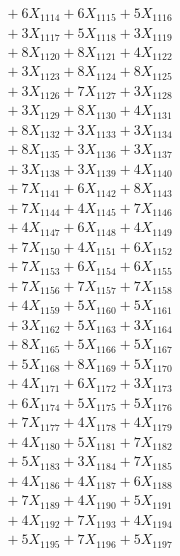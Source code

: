 \documentclass[a4paper,10pt]{article}
\begin{document}
{\begin{align}
&\;  + 6 X_{1114} + 6 X_{1115} + 5 X_{1116} \\[0.3ex]
&\;  + 3 X_{1117} + 5 X_{1118} + 3 X_{1119} \\[0.5ex]\allowbreak
&\;  + 8 X_{1120} + 8 X_{1121} + 4 X_{1122} \\[0.3ex]
&\;  + 3 X_{1123} + 8 X_{1124} + 8 X_{1125} \\[0.3ex]
&\;  + 3 X_{1126} + 7 X_{1127} + 3 X_{1128} \\[0.3ex]
&\;  + 3 X_{1129} + 8 X_{1130} + 4 X_{1131} \\[0.3ex]
&\;  + 8 X_{1132} + 3 X_{1133} + 3 X_{1134} \\[0.3ex]
&\;  + 8 X_{1135} + 3 X_{1136} + 3 X_{1137} \\[0.3ex]
&\;  + 3 X_{1138} + 3 X_{1139} + 4 X_{1140} \\[0.3ex]
&\;  + 7 X_{1141} + 6 X_{1142} + 8 X_{1143} \\[0.3ex]
&\;  + 7 X_{1144} + 4 X_{1145} + 7 X_{1146} \\[0.3ex]
&\;  + 4 X_{1147} + 6 X_{1148} + 4 X_{1149} \\[0.5ex]\allowbreak
&\;  + 7 X_{1150} + 4 X_{1151} + 6 X_{1152} \\[0.3ex]
&\;  + 7 X_{1153} + 6 X_{1154} + 6 X_{1155} \\[0.3ex]
&\;  + 7 X_{1156} + 7 X_{1157} + 7 X_{1158} \\[0.3ex]
&\;  + 4 X_{1159} + 5 X_{1160} + 5 X_{1161} \\[0.3ex]
&\;  + 3 X_{1162} + 5 X_{1163} + 3 X_{1164} \\[0.3ex]
&\;  + 8 X_{1165} + 5 X_{1166} + 5 X_{1167} \\[0.3ex]
&\;  + 5 X_{1168} + 8 X_{1169} + 5 X_{1170} \\[0.3ex]
&\;  + 4 X_{1171} + 6 X_{1172} + 3 X_{1173} \\[0.3ex]
&\;  + 6 X_{1174} + 5 X_{1175} + 5 X_{1176} \\[0.3ex]
&\;  + 7 X_{1177} + 4 X_{1178} + 4 X_{1179} \\[0.5ex]\allowbreak
&\;  + 4 X_{1180} + 5 X_{1181} + 7 X_{1182} \\[0.3ex]
&\;  + 5 X_{1183} + 3 X_{1184} + 7 X_{1185} \\[0.3ex]
&\;  + 4 X_{1186} + 4 X_{1187} + 6 X_{1188} \\[0.3ex]
&\;  + 7 X_{1189} + 4 X_{1190} + 5 X_{1191} \\[0.3ex]
&\;  + 4 X_{1192} + 7 X_{1193} + 4 X_{1194} \\[0.3ex]
&\;  + 5 X_{1195} + 7 X_{1196} + 5 X_{1197} \\[0.3ex]

\end{align}}
\end{document}
